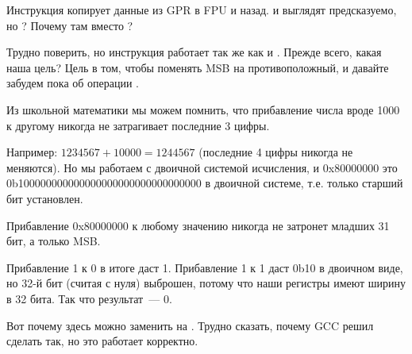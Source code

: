 Инструкция \FMRS копирует данные из \ac{GPR} в FPU и назад.
 и  выглядят предсказуемо, но ?
Почему там \ADD вместо \XOR?

Трудно поверить, но инструкция 
 работает так же как и .
Прежде всего, какая наша цель?
Цель в том, чтобы поменять \ac{MSB} на противоположный, и давайте забудем пока об операции \XOR.

Из школьной математики мы можем помнить, что прибавление числа вроде 1000 к другому никогда не затрагивает последние 3 цифры.

Например: $1234567 + 10000 = 1244567$ (последние 4 цифры никогда не меняются).
Но мы работаем с двоичной системой исчисления, и 0x80000000 это 0b100000000000000000000000000000000
в двоичной системе, т.е. только старший бит установлен.

Прибавление 0x80000000 к любому значению никогда не затронет младших 31 бит, а только \ac{MSB}.

Прибавление 1 к 0 в итоге даст 1.
Прибавление 1 к 1 даст 0b10 в двоичном виде, но 32-й бит (считая с нуля) выброшен, 
потому что наши регистры имеют ширину в 32 бита. Так что результат~--- 0.

Вот почему \XOR здесь можно заменить на \ADD.
Трудно сказать, почему GCC решил сделать так, но это работает корректно.%

